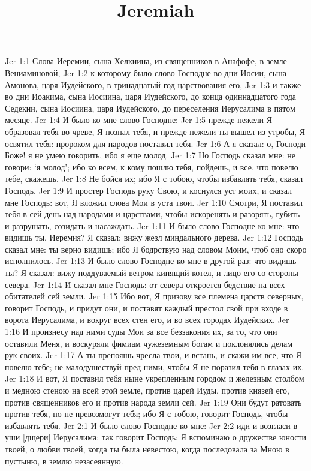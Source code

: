 

\title{Jeremiah}

Jer 1:1  Слова Иеремии, сына Хелкиина, из священников в Анафофе, в земле Вениаминовой,
Jer 1:2  к которому было слово Господне во дни Иосии, сына Амонова, царя Иудейского, в тринадцатый год царствования его,
Jer 1:3  и также во дни Иоакима, сына Иосиина, царя Иудейского, до конца одиннадцатого года Седекии, сына Иосиина, царя Иудейского, до переселения Иерусалима в пятом месяце.
Jer 1:4  И было ко мне слово Господне:
Jer 1:5  прежде нежели Я образовал тебя во чреве, Я познал тебя, и прежде нежели ты вышел из утробы, Я освятил тебя: пророком для народов поставил тебя.
Jer 1:6  А я сказал: о, Господи Боже! я не умею говорить, ибо я еще молод.
Jer 1:7  Но Господь сказал мне: не говори: `я молод'; ибо ко всем, к кому пошлю тебя, пойдешь, и все, что повелю тебе, скажешь.
Jer 1:8  Не бойся их; ибо Я с тобою, чтобы избавлять тебя, сказал Господь.
Jer 1:9  И простер Господь руку Свою, и коснулся уст моих, и сказал мне Господь: вот, Я вложил слова Мои в уста твои.
Jer 1:10  Смотри, Я поставил тебя в сей день над народами и царствами, чтобы искоренять и разорять, губить и разрушать, созидать и насаждать.
Jer 1:11  И было слово Господне ко мне: что видишь ты, Иеремия? Я сказал: вижу жезл миндального дерева.
Jer 1:12  Господь сказал мне: ты верно видишь; ибо Я бодрствую над словом Моим, чтоб оно скоро исполнилось.
Jer 1:13  И было слово Господне ко мне в другой раз: что видишь ты? Я сказал: вижу поддуваемый ветром кипящий котел, и лицо его со стороны севера.
Jer 1:14  И сказал мне Господь: от севера откроется бедствие на всех обитателей сей земли.
Jer 1:15  Ибо вот, Я призову все племена царств северных, говорит Господь, и придут они, и поставят каждый престол свой при входе в ворота Иерусалима, и вокруг всех стен его, и во всех городах Иудейских.
Jer 1:16  И произнесу над ними суды Мои за все беззакония их, за то, что они оставили Меня, и воскуряли фимиам чужеземным богам и поклонялись делам рук своих.
Jer 1:17  А ты препояшь чресла твои, и встань, и скажи им все, что Я повелю тебе; не малодушествуй пред ними, чтобы Я не поразил тебя в глазах их.
Jer 1:18  И вот, Я поставил тебя ныне укрепленным городом и железным столбом и медною стеною на всей этой земле, против царей Иуды, против князей его, против священников его и против народа земли сей.
Jer 1:19  Они будут ратовать против тебя, но не превозмогут тебя; ибо Я с тобою, говорит Господь, чтобы избавлять тебя.
Jer 2:1  И было слово Господне ко мне:
Jer 2:2  иди и возгласи в уши [дщери] Иерусалима: так говорит Господь: Я вспоминаю о дружестве юности твоей, о любви твоей, когда ты была невестою, когда последовала за Мною в пустыню, в землю незасеянную.
